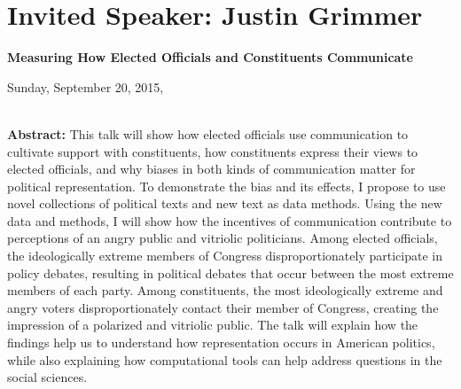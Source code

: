 

\clearpage{}


\section{Invited Speaker: Justin Grimmer}


\begin{center}
\textbf{\Large{}Measuring How Elected Officials and Constituents Communicate}{\Large{}\vspace{1em}
}
\par\end{center}{\Large \par}

\begin{center}
Sunday, September 20, 2015,  \vspace{1em}
\\
 \PlenaryLoc \\
 \vspace{1em}

\par\end{center}

\noindent \textbf{Abstract:} This talk will show how elected officials
use communication to cultivate support with constituents, how constituents
express their views to elected officials, and why biases in both kinds
of communication matter for political representation. To demonstrate
the bias and its effects, I propose to use novel collections of political
texts and new text as data methods. Using the new data and methods,
I will show how the incentives of communication contribute to perceptions
of an angry public and vitriolic politicians. Among elected officials,
the ideologically extreme members of Congress disproportionately participate
in policy debates, resulting in political debates that occur between
the most extreme members of each party. Among constituents, the most
ideologically extreme and angry voters disproportionately contact
their member of Congress, creating the impression of a polarized and
vitriolic public. The talk will explain how the findings help us to
understand how representation occurs in American politics, while also
explaining how computational tools can help address questions in the
social sciences.

\vspace{3em}


\vfill{}


